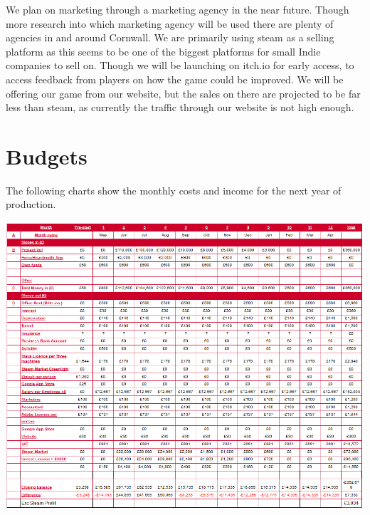 \documentclass{scrartcl}
\begin{document}
We plan on marketing through a marketing agency in the near future.
Though more research into which marketing agency will be used there are plenty of agencies in and around Cornwall.
We are primarily using steam as a selling platform as this seems to be one of the biggest platforms for small Indie companies to sell on.
Though we will be launching on itch.io for early access, to access feedback from players on how the game could be improved.
We will be offering our game from our website, but the sales on there are projected to be far less than steam, as currently the traffic through our website is not high enough.

\newpage
\section{Budgets}

The following charts show the monthly costs and income for the next year of production.
\newline
\begin{center}
	\includegraphics[scale=0.56]{CostsChart}	
	\newline
\end{center}
\end{document}

